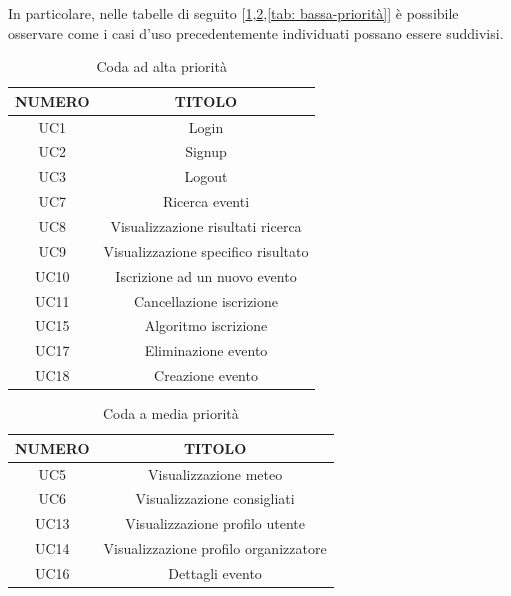 In particolare, nelle tabelle di seguito [\ref*{tab: alta-priorità},\ref*{tab: media-priorità},\ref*{tab: bassa-priorità}] 
è possibile osservare come i casi d'uso precedentemente individuati possano essere suddivisi.
\clearpage

\begin{table}
\begin{center}
\begin{tabular}{|c|c|}
 \hline
 \textbf{NUMERO}& \textbf{TITOLO} \\ \hline
 UC1& Login\\ \hline
 UC2& Signup\\ \hline
 UC3& Logout\\ \hline
 UC7 & Ricerca eventi \\ \hline
 UC8 & Visualizzazione risultati ricerca \\ \hline
 UC9 & Visualizzazione specifico risultato \\ \hline
 UC10 & Iscrizione ad un nuovo evento\\ \hline
 UC11 & Cancellazione iscrizione\\ \hline
 UC15& Algoritmo iscrizione\\ \hline
 UC17& Eliminazione evento\\ \hline
 UC18& Creazione evento\\ \hline
\end{tabular}
  \caption{Coda ad alta priorità}
  \label{tab: alta-priorità}
\end{center}
\end{table}

\begin{table}
\begin{center}
\begin{tabular}{ |c|c|}
 \hline
 \textbf{NUMERO}& \textbf{TITOLO} \\ \hline
 UC5& Visualizzazione meteo\\ \hline
 UC6& Visualizzazione consigliati\\ \hline
 UC13&Visualizzazione profilo utente\\ \hline
 UC14&Visualizzazione profilo organizzatore\\ \hline
 UC16& Dettagli evento\\ \hline
\end{tabular}
  \caption{Coda a media priorità}
  \label{tab: media-priorità}
\end{center}
\end{table}

